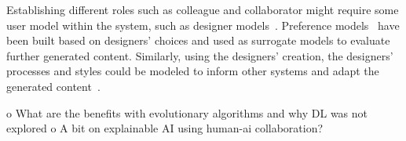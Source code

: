Establishing different roles such as colleague and collaborator might require some user model within the system, such as designer models~\cite{liapis_designer_2013}. Preference models~\cite{alvarez_learning_2020,liapis_adapting_2012} have been built based on designers' choices and used as surrogate models to evaluate further generated content. Similarly, using the designers' creation, the designers' processes and styles could be modeled to inform other systems and adapt the generated content~\cite{liapis_designer_2014,alvarez_designer_2022,halina_threshold_2022}.

o	What are the benefits with evolutionary algorithms and why DL was not explored
o	A bit on explainable AI using human-ai collaboration?



